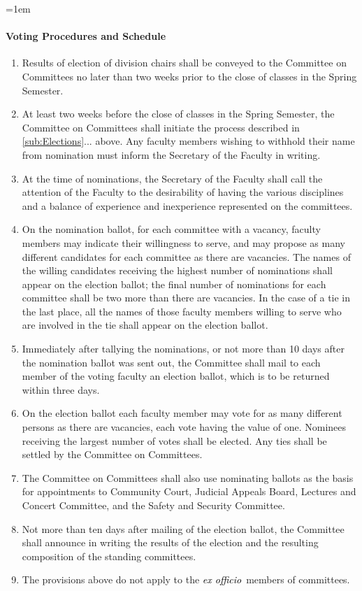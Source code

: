 \documentclass{manual}
\newcommand{\keyword}[1]{\textcolor{black}{#1}}
\newcommand{\exoff}{\keyword{\textit{ex officio}}~}
\let\oldparagraph\paragraph
\renewcommand\paragraph{\leftskip=1em\oldparagraph}
\newcommand{\editRemove}[1]{}
\newcommand{\itemLevelA}{\alph*.}
\newcommand{\itemRefA}{\alph*}
\begin{document}
\paragraph{Voting Procedures and Schedule}
\begin{enumerate}[label=\itemLevelA,ref=\itemRefA]
\item Results of election of division chairs shall be conveyed to the Committee on Committees no later than two weeks prior to the close of classes in the Spring Semester.
\item At least two weeks before the close of classes in the Spring Semester, the Committee on Committees shall initiate the process described in \cref{sub:Elections}... above. Any faculty members wishing to withhold their name from nomination must inform the Secretary of the Faculty in writing.
\item At the time of nominations, the Secretary of the Faculty shall call the attention of the Faculty to the desirability of having the various disciplines and a balance of experience and inexperience represented on the committees.
\item On the nomination ballot, for each committee with a vacancy, \editRemove{each} faculty members may indicate their willingness to serve, and may propose as many different candidates for each committee as there are vacancies. The names of the willing candidates receiving the highest number of nominations shall appear on the election ballot; the final number of nominations for each committee shall be two more than there are vacancies. In the case of a tie in the last place, all the names of those faculty members willing to serve who are involved in the tie shall appear on the election ballot.
\item Immediately after tallying the nominations, or not more than 10 days after the nomination ballot was sent out, the Committee shall mail to each member of the voting faculty an election ballot, which is to be returned within three days.
\item On the election ballot each faculty member may vote for as many different persons as there are vacancies, each vote having the value of one. Nominees receiving the largest number of votes shall be elected. Any ties shall be settled by the Committee on Committees.
\item The Committee on Committees shall also use nominating ballots as the basis for appointments to Community Court, Judicial Appeals Board, Lectures and Concert Committee, and the Safety and Security Committee.
\item Not more than ten days after mailing of the election ballot, the Committee shall announce in writing the results of the election and the resulting composition of the standing committees.
\item The provisions above do not apply to the \exoff members of committees. 
\end{enumerate}
\end{document}
